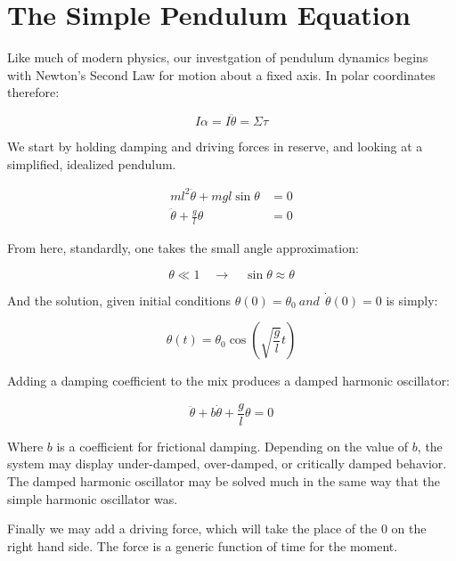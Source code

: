 \documentclass[aps,pre,nofootinbib]{revtex4}
\begin{document}
\section{The Simple Pendulum Equation}

Like much of modern physics, our investgation of pendulum dynamics begins with Newton's Second Law for motion about a fixed axis.  In polar coordinates therefore: 

\begin{equation}
\label{Newton_II}
I \alpha = I \ddot{\theta} =  \Sigma \tau
\end{equation}

We start by holding damping and driving forces in reserve, and looking at a simplified, idealized pendulum.

\begin{align}
\label{idealized_pendulum}
m l^2 \ddot{\theta} + m g l \sin{\theta} & = 0 \\
 \ddot{\theta} + \frac{g}{l}\theta & = 0
\end{align}

From here, standardly, one takes the small angle approximation: 

\begin{equation}
\label{small_angle_approximation}
\theta \ll 1 \quad  \rightarrow \quad  \sin\theta \approx \theta
\end{equation}

And the solution, given initial conditions $\theta(0) = \theta_0 \ and \  \  \dot{\theta}(0) = 0$ is simply:

\begin{equation}
\label{SHO_soln_1}
\theta(t) = \theta_0 \cos{(\sqrt{\frac{g}{l}}t)}
\end{equation}

Adding a damping coefficient to the mix produces a damped harmonic oscillator: 

\begin{equation}
\label{damped_harmonic_oscillator}
 \ddot{\theta} +  b \dot{\theta} + \frac{g}{l}\theta = 0
\end{equation}

Where $b$ is a coefficient for frictional damping.  Depending on the value of $b$, the system may display under-damped, over-damped, or critically damped behavior.  The damped harmonic oscillator may be solved much in the same way that the simple harmonic oscillator was.  



Finally we may add a driving force, which will take the place of the $0$ on the right hand side.  The force is a generic function of time for the moment.  
\end{document}

